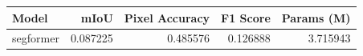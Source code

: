 \begin{tabular}{lrrrr}
\toprule
Model & mIoU & Pixel Accuracy & F1 Score & Params (M) \\
\midrule
segformer & 0.087225 & 0.485576 & 0.126888 & 3.715943 \\
\bottomrule
\end{tabular}
